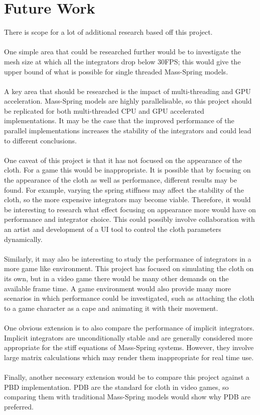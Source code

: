 \section{Future Work}
There is scope for a lot of additional research based off this project.
\\\\One simple area that could be researched further would be to investigate the mesh size at which all the integrators drop below 30FPS; this would give the upper bound of what is possible for single threaded Mass-Spring models.
\\\\A key area that should be researched is the impact of multi-threading and GPU acceleration. Mass-Spring models are highly parallelisable, so this project should be replicated for both multi-threaded CPU and GPU accelerated implementations. It may be the case that the improved performance of the parallel implementations increases the stability of the integrators and could lead to different conclusions.
\\\\One caveat of this project is that it has not focused on the appearance of the cloth. For a game this would be inappropriate. It is possible that by focusing on the appearance of the cloth as well as performance, different results may be found. For example, varying the spring stiffness may affect the stability of the cloth, so the more expensive integrators may become viable. Therefore, it would be interesting to research what effect focusing on appearance more would have on performance and integrator choice. This could possibly involve collaboration with an artist and development of a UI tool to control the cloth parameters dynamically.
\\\\Similarly, it may also be interesting to study the performance of integrators in a more game like environment. This project has focused on simulating the cloth on its own, but in a video game there would be many other demands on the available frame time. A game environment would also provide many more scenarios in which performance could be investigated, such as attaching the cloth to a game character as a cape and animating it with their movement.
\\\\One obvious extension is to also compare the performance of implicit integrators. Implicit integrators are unconditionally stable and are generally considered more appropriate for the stiff equations of Mass-Spring systems. However, they involve large matrix calculations which may render them inappropriate for real time use.
\\\\Finally, another necessary extension would be to compare this project against a PBD implementation. PDB are the standard for cloth in video games, so comparing them with traditional Mass-Spring models would show why PDB are preferred.